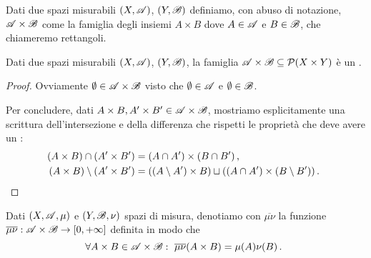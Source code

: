 \begin{definition}\label{def:SemianelloProdotto}
	Dati due spazi misurabili $(X,\mathscr A)$, $(Y,\mathscr B)$ definiamo, con abuso di notazione, $\mathscr A\times\mathscr B$ come la famiglia degli insiemi $A\times B$ dove $A\in\mathscr A$ e $B\in\mathscr B$, che chiameremo rettangoli.
\end{definition}

\begin{proposition}\label{prop:SemianelloProdotto}
	Dati due spazi misurabili $(X,\mathscr A)$, $(Y,\mathscr B)$, la famiglia $\mathscr A\times\mathscr B\subseteq \mathcal P(X\times Y)$ è un \semiring{}.
\end{proposition}
\begin{proof}
	Ovviamente $\emptyset\in\mathscr A\times\mathscr B$ visto che $\emptyset\in\mathscr A$ e $\emptyset\in\mathscr B$.
	
	Per concludere, dati $A\times B, A'\times B'\in\mathscr A\times\mathscr B$, mostriamo esplicitamente una scrittura dell'intersezione e della differenza che rispetti le proprietà che deve avere un \semiring{}:
	\begin{align*}
		(A\times B)\cap (A'\times B') &= (A\cap A')\times(B\cap B')\, \text{, } \\
		(A\times B)\setminus (A'\times B') &= ((A\setminus A')\times B)\sqcup( (A\cap A')\times (B\setminus B') )\, \text{. }
	\end{align*}
\end{proof}

\begin{definition}\label{def:PremisuraProdotto}
	Dati $(X,\mathscr A,\mu)$ e $(Y,\mathscr B,\nu)$ spazi di misura, denotiamo con $\overline{\mu\nu}$ la funzione $\overline{\mu\nu}:\mathscr A\times\mathscr B\to[0,+\infty]$ definita in modo che 
	\begin{equation*}
		\forall A\times B\in\mathscr A\times\mathscr B:\ \overline{\mu\nu}(A\times B)=\mu(A)\nu(B)\, \text{. }
	\end{equation*}
\end{definition}

